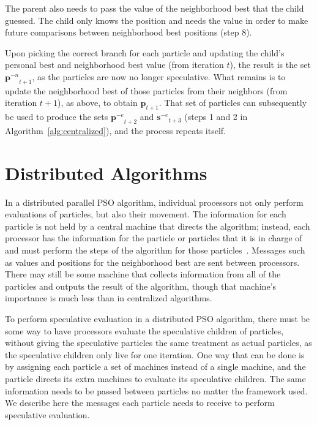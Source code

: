 \documentclass[ms,electronic,twosidetoc,letterpaper,chaptercenter,parttop,equalmargins]{byumsphd}
\newcommand{\alg}[1]{Algorithm~\ref{alg:#1}}
\providecommand{\noeval}[1]{\ensuremath{#1^{-e}}}
\providecommand{\nonbest}[1]{\ensuremath{#1^{-n}}}
\providecommand{\pset}{\ensuremath{\mathbf{p}}}
\providecommand{\sset}{\ensuremath{\mathbf{s}}}
\begin{document}
The parent also needs to pass the value of the neighborhood best that the child
guessed.  The child only knows the position and needs the value in order to
make future comparisons between neighborhood best positions (step 8).

Upon picking the correct branch for each particle and updating the child's
personal best and neighborhood best value (from iteration $t$), the result is
the set $\nonbest{\pset}_{t+1}$, as the particles are now no longer
speculative.  What remains is to update the neighborhood best of those
particles from their neighbors (from iteration $t+1$), as above, to obtain
$\pset_{t+1}$.  That set of particles can subsequently be used to produce the
sets $\noeval{\pset}_{t+2}$ and $\noeval{\sset}_{t+3}$ (steps 1 and 2 in
\alg{centralized}), and the process repeats itself.

\section{Distributed Algorithms}

\label{sec:distributed}

In a distributed parallel PSO algorithm, individual processors not only perform
evaluations of particles, but also their movement.  The information for each
particle is not held by a central machine that directs the algorithm; instead,
each processor has the information for the particle or particles that it is in
charge of and must perform the steps of the algorithm for those
particles~\citep{mcnabb-2007-parallel-pso-using-mapreduce}.  Messages such as
values and positions for the neighborhood best are sent between processors.
There may still be some machine that collects information from all of the
particles and outputs the result of the algorithm, though that machine's
importance is much less than in centralized algorithms.

To perform speculative evaluation in a distributed PSO algorithm, there must be
some way to have processors evaluate the speculative children of particles,
without giving the speculative particles the same treatment as actual
particles, as the speculative children only live for one iteration.  One way
that can be done is by assigning each particle a set of machines instead of a
single machine, and the particle directs its extra machines to evaluate its
speculative children.  The same information needs to be passed between
particles no matter the framework used.  We describe here the messages each
particle needs to receive to perform speculative evaluation.
\end{document}
